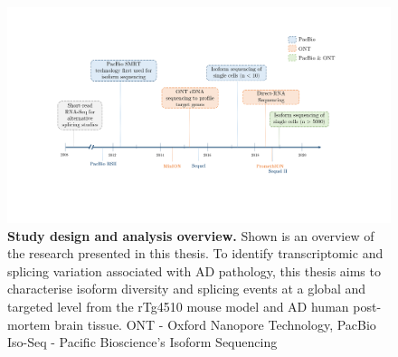 \begin{landscape}
	\begin{figure}[htb]
		\begin{center}
			\includegraphics[page=2,trim={0 0 0 0},clip,scale = 0.7]{Figures/Introduction_Figures_Landscape.pdf}
		\end{center}
		\captionsetup{width=1.5\textwidth}
		\caption[Study design and analysis overview]%
		{\textbf{Study design and analysis overview.} Shown is an overview of the research presented in this thesis. To identify transcriptomic and splicing variation associated with AD pathology, this thesis aims to characterise isoform diversity and splicing events at a global and targeted level from the rTg4510 mouse model and AD human post-mortem brain tissue. ONT - Oxford Nanopore Technology, PacBio Iso-Seq - Pacific Bioscience's Isoform Sequencing}
		\label{fig:studydesign}
	\end{figure} 	
\end{landscape}
